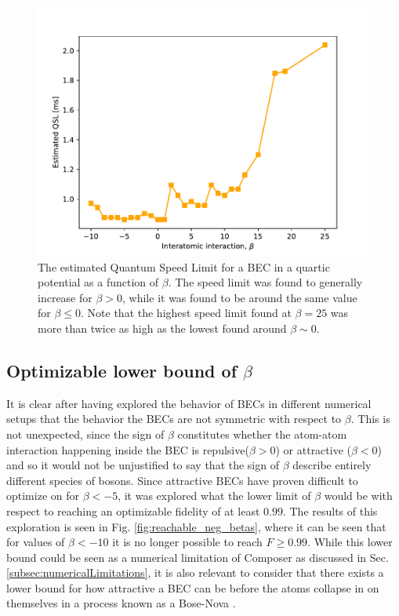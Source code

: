\documentclass[a4paper, twocolumn]{revtex4-1}
\begin{document}
\begin{figure}[h]
	\includegraphics[width=\columnwidth]{graphics/exploration/QSL.pdf}
	\caption{The estimated Quantum Speed Limit for a BEC in a quartic potential as a function of $\beta$. The speed limit was found to generally increase for $\beta>0$, while it was found to be around the same value for $\beta\leq0$. Note that the highest speed limit found at $\beta=25$ was more than twice as high as the lowest found around $\beta \sim 0$.}
	\label{fig:QSL}
\end{figure}

\subsection{Optimizable lower bound of $\beta$}\label{subsec:optimizable-lower-bound-composer}

It is clear after having explored the behavior of BECs in different numerical setups that the behavior the BECs are not symmetric with respect to $\beta$. This is not unexpected, since the sign of $\beta$ constitutes whether the atom-atom interaction happening inside the BEC is repulsive($\beta>0$) or attractive ($\beta<0$) and so it would not be unjustified to say that the sign of $\beta$ describe entirely different species of bosons. Since attractive BECs have proven difficult to optimize on for $\beta<-5$, it was explored what the lower limit of $\beta$ would be with respect to reaching an optimizable fidelity of at least $0.99$. The results of this exploration is seen in Fig. \ref{fig:reachable_neg_betas}, where it can be seen that for values of $\beta<-10$ it is no longer possible to reach $F\geq0.99$. While this lower bound could be seen as a numerical limitation of Composer as discussed in Sec. \ref{subsec:numericalLimitations}, it is also relevant to consider that there exists a lower bound for how attractive a BEC can be before the atoms collapse in on themselves in a process known as a Bose-Nova \cite{Donley2001}.
\end{document}
